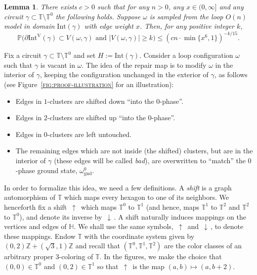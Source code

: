 \documentclass[12pt,reqno]{article}
\def\Z{\mathbb{Z}}
\def\T{\mathbb{T}}
\newtheorem{lemma}[theorem]{Lemma}
\renewcommand{\Pr}{\mathbb{P}}
\newcommand{\HH}{\mathbb{H}}
\newcommand{\ground}{\omega_{\operatorname{gnd}}}
\newcommand{\reffig}[1] {\textsc{\ref{#1}}}
\newcommand{\Int}[1]{\mathrm{Int}(#1)}
\newcommand{\IntVert}[1]{\mathrm{Int}^\mathrm{V}(#1)}
\newcommand{\DIRup}{\,\uparrow\,}
\newcommand{\DIRdown}{\,\downarrow\,}
\begin{document}
\begin{lemma}
    \label{lem:prob-outer-circuit}
    There exists $c>0$ such that for any $n>0$, any $x \in (0,\infty]$ and any circuit $\gamma\subset \T\setminus\T^0$ the following holds. Suppose $\omega$ is sampled from the loop $O(n)$ model in domain $\Int\gamma$ with edge weight $x$. Then, for any positive integer $k$,
    \[
    \Pr\big(\partial\IntVert\gamma\subset V(\omega,\gamma)\text{ and }|V(\omega,\gamma)|\ge k \big) \le (cn \cdot \min\{x^6,1\})^{-k/15} .
    \]
\end{lemma}




\medbreak
{}
\label{sec:repair-map}
Fix a circuit $\gamma\subset \T\setminus \T^0$ and set $H := \Int\gamma$.
 Consider a loop configuration $\omega$ such that $\gamma$ is vacant in $\omega$. The idea of the repair map is to modify $\omega$ in the interior of $\gamma$, keeping the configuration unchanged in the exterior of $\gamma$, as follows (see Figure~\reffig{fig:proof-illustration} for an illustration):
\begin{itemize}[noitemsep,topsep=0.5em]
\setlength\itemsep{0.25em}
\item
  Edges in $1$-clusters are shifted down ``into the $0$-phase''.
\item
  Edges in $2$-clusters are shifted up ``into the $0$-phase''.
\item
  Edges in $0$-clusters are left untouched.
\item
  The remaining edges which are not inside (the shifted) clusters, but are in the interior of $\gamma$ (these edges will be called {\em bad}), are overwritten to ``match'' the $0$-phase ground state, $\ground^0$.
\end{itemize}

In order to formalize this idea, we need a few definitions. A
\emph{shift} is a graph automorphism of $\T$ which maps every
hexagon to one of its neighbors. We henceforth fix a shift $\DIRup$
which maps $\T^0$ to $\T^1$ (and hence, maps $\T^1$ to $\T^2$ and
$\T^2$ to $\T^0$), and denote its inverse by $\DIRdown$. A shift
naturally induces mappings on the vertices and
edges of $\HH$. We shall use the same symbols, $\DIRup$ and
$\DIRdown$, to denote these mappings. Endow $\T$ with the coordinate system given by
$(0,2)\Z + (\sqrt3,1)\Z$ and recall that $(\T^0, \T^1, \T^2)$ are the color
classes of an arbitrary proper $3$-coloring of $\T$. In the figures,
we make the choice that $(0,0) \in \T^0$ and $(0,2) \in \T^1$ so
that $\DIRup$ is the map $(a,b) \mapsto (a,b+2)$.
\end{document}
